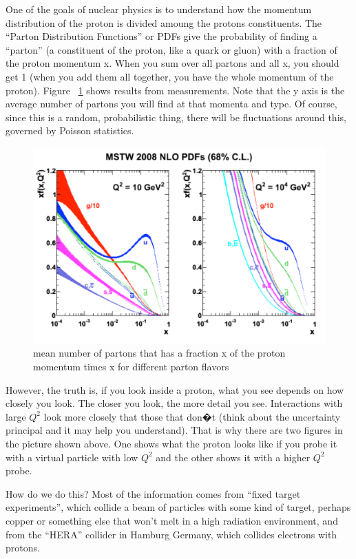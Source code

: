 One of the goals of nuclear physics is to understand how the momentum distribution of the proton is divided amoung the protons constituents.  The ``Parton Distribution Functions'' or PDFs give the probability of finding a ``parton'' (a constituent of the proton, like a quark or gluon) with a fraction of the proton momentum x.  When you sum over all partons and all x, you should get 1 (when you add them all together, you have the whole momentum of the proton).  Figure ~\ref{fig:pdfpdf} shows results from measurements.  Note that the y axis is the average number of partons you will find at that momenta and type.  Of course, since this is a random, probabilistic thing, there will be fluctuations around this, governed by Poisson statistics.

\begin{figure}[h]
\centering\includegraphics[scale=0.5]{./protonprotoncollisions/Pictures/fig2.pdf}
\caption{mean number of  partons that has a fraction x of the proton momentum times x for different parton flavors}
\label{fig:pdfpdf}
\end{figure}
However, the truth is, if you look inside a proton, what you see depends on how closely you look. The closer you look, the more detail you see.  Interactions with large \(Q^{2}\) look more closely that those that don�t (think about the uncertainty principal and it may help you understand).  That is why there are two figures in the picture shown above.  One shows what the proton looks like if you probe it with a virtual particle with low \(Q^{2}\) and the other shows it with a higher \(Q^{2}\) probe.

How do we do this?  Most of the information comes from ``fixed target experiments'', which collide a beam of particles with some kind of target, perhaps copper or something else that won't melt in a high radiation environment, and from the ``HERA'' collider in Hamburg Germany, which collides electrons with protons.

